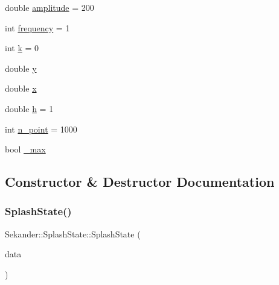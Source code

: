\begin{DoxyCompactItemize}
double \hyperlink{classSekander_1_1SplashState_aad2e0b38cdf830b13e042c69cd2e758b}{amplitude} = 200
\item 
int \hyperlink{classSekander_1_1SplashState_a52681392f4d654d97af9504e8aa21aa0}{frequency} = 1
\item 
int \hyperlink{classSekander_1_1SplashState_a9442aa523cd10d3bbf8bc3da82b310c0}{k} = 0
\item 
double \hyperlink{classSekander_1_1SplashState_a6ae3a31d30343bb45aadef7966320668}{y}
\item 
double \hyperlink{classSekander_1_1SplashState_a5f21fde83d2389f995b64ab313716a09}{x}
\item 
double \hyperlink{classSekander_1_1SplashState_a98175bbd61d8dd4d74a813e5aada605d}{h} = 1
\item 
int \hyperlink{classSekander_1_1SplashState_a0d393d6f228cd011e23dcec4723f327a}{n\+\_\+point} = 1000
\item 
bool \hyperlink{classSekander_1_1SplashState_ae06ef54f8cd627aee5ca845eea105e0a}{\+\_\+max}
\end{DoxyCompactItemize}


\subsection{Constructor \& Destructor Documentation}
\mbox{\label{classSekander_1_1SplashState_ae341ef8552453a1d343dcad68de101b5}} 
\subsubsection{\texorpdfstring{Splash\+State()}{SplashState()}\hspace{0.1cm}{\footnotesize\ttfamily [1/2]}}
{\footnotesize\ttfamily Sekander\+::\+Splash\+State\+::\+Splash\+State (\begin{DoxyParamCaption}\item[{\hyperlink{namespaceSekander_a1d69b002ba2d23020901c28f0def5e16}{Game\+Data\+Ref}}]{data }\end{DoxyParamCaption})}

\mbox{\label{classSekander_1_1SplashState_aeb0bbd0553d10ed561166578b3fba993}} 

